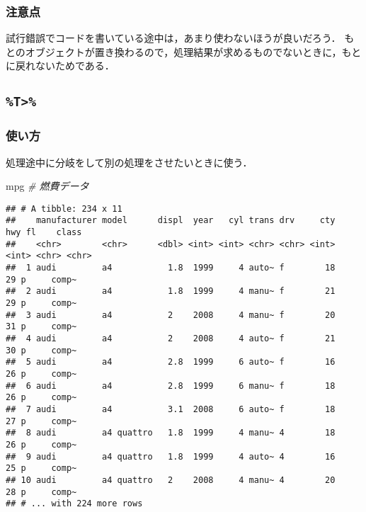 \documentclass[
]{article}
\newenvironment{Shaded}{\begin{snugshade}}{\end{snugshade}}
\newcommand{\CommentTok}[1]{\textcolor[rgb]{0.56,0.35,0.01}{\textit{#1}}}
\newcommand{\NormalTok}[1]{#1}
\begin{document}
\hypertarget{ux6ce8ux610fux70b9}{%
\subsubsection{注意点}\label{ux6ce8ux610fux70b9}}

試行錯誤でコードを書いている途中は，あまり使わないほうが良いだろう．
もとのオブジェクトが置き換わるので，処理結果が求めるものでないときに，もとに戻れないためである．

\hypertarget{t}{%
\subsection{\texorpdfstring{\texttt{\%T\textgreater{}\%}}{\%T\textgreater\%}}\label{t}}

\hypertarget{ux4f7fux3044ux65b9-1}{%
\subsubsection{使い方}\label{ux4f7fux3044ux65b9-1}}

処理途中に分岐をして別の処理をさせたいときに使う．

\begin{Shaded}
\begin{Highlighting}[]
\NormalTok{mpg }\CommentTok{\# 燃費データ}
\end{Highlighting}
\end{Shaded}

\begin{verbatim}
## # A tibble: 234 x 11
##    manufacturer model      displ  year   cyl trans drv     cty   hwy fl    class
##    <chr>        <chr>      <dbl> <int> <int> <chr> <chr> <int> <int> <chr> <chr>
##  1 audi         a4           1.8  1999     4 auto~ f        18    29 p     comp~
##  2 audi         a4           1.8  1999     4 manu~ f        21    29 p     comp~
##  3 audi         a4           2    2008     4 manu~ f        20    31 p     comp~
##  4 audi         a4           2    2008     4 auto~ f        21    30 p     comp~
##  5 audi         a4           2.8  1999     6 auto~ f        16    26 p     comp~
##  6 audi         a4           2.8  1999     6 manu~ f        18    26 p     comp~
##  7 audi         a4           3.1  2008     6 auto~ f        18    27 p     comp~
##  8 audi         a4 quattro   1.8  1999     4 manu~ 4        18    26 p     comp~
##  9 audi         a4 quattro   1.8  1999     4 auto~ 4        16    25 p     comp~
## 10 audi         a4 quattro   2    2008     4 manu~ 4        20    28 p     comp~
## # ... with 224 more rows
\end{verbatim}
\end{document}
